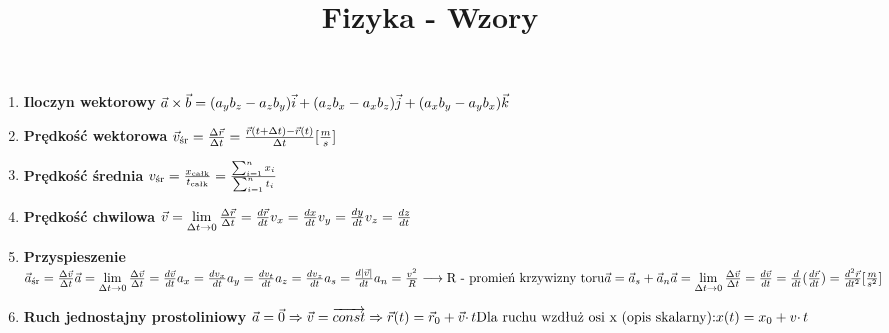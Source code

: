 \documentclass{article}
\author{}
\title{Fizyka - Wzory}
\date{}
\begin{document}
	\maketitle

	\begin{enumerate}
		\item \textbf{Iloczyn wektorowy} $ \\
		 \vec{a} \times \vec{b} = (a_yb_z - a_zb_y)\vec{i} + (a_zb_x - a_xb_z)\vec{j} + (a_xb_y - a_yb_x)\vec{k}
		 $
		\item \textbf{Prędkość wektorowa} $ \\
		\vec{v}_\text{śr} = \frac{\Delta\vec{r}}{\Delta t} = \frac{\vec{r}(t + \Delta t) - \vec{r}(t)}{\Delta t}  [\frac{m}{s}]
		$
		
		\item \textbf{Prędkość średnia} $ \\
		v_\text{śr} = \frac{x_\text{całk}}{t_\text{całk}} = \frac{\sum_{i=1}^{n}x_i}{\sum_{i=1}^{n}t_i}
		$
		
		\item \textbf{Prędkość chwilowa} $ \\
		\vec{v} = \lim\limits_{\Delta t \to 0} \frac{\Delta \vec{r}}{\Delta t} = \frac{d \vec{r}}{dt}
		\\
		v_x = \frac{dx}{dt}
		\\
		v_y = \frac{dy}{dt}
		\\
		v_z = \frac{dz}{dt}
		$
		
		\item \textbf{Przyspieszenie} $ \\
		\vec{a}_\text{śr} = \frac{\Delta \vec{v}}{\Delta t} 
		\\
		\vec{a} = \lim\limits_{\Delta t \to 0} \frac{\Delta \vec{v}}{\Delta t} = \frac{d \vec{v}}{dt}
		\\
		a_x = \frac{dv_x}{dt}
		\\
		a_y = \frac{dv_t}{dt}
		\\
		a_z = \frac{dv_z}{dt} 
		\\
		a_s = \frac{d |\vec{v}|}{dt}
		\\
		a_n = \frac{v^2}{R} \longrightarrow \text{R - promień krzywizny toru}
		\\
		\vec{a} = \vec{a}_s + \vec{a}_n 
		\\
		\vec{a} = \lim\limits_{\Delta t \rightarrow 0} \frac{\Delta \vec{v}}{\Delta t} = \frac{d \vec{v}}{dt} = \frac{d}{dt} (\frac{d \vec{r}}{dt}) = \frac{d^2 \vec{r}}{dt^2} [\frac{m}{s^2}]
		$
		
		\item \textbf{Ruch jednostajny prostoliniowy} $ \\
		\vec{a} = \vec{0} \Rightarrow \vec{v} = \overrightarrow{const} \Rightarrow \vec{r}(t) = \vec{r}_0 + \vec{v} \cdotp t
		\\
		\text{Dla ruchu wzdłuż osi x (opis skalarny):}
		\\
		x(t) = x_0 + v \cdotp t
		$
		

\end{enumerate}
\end{document}
